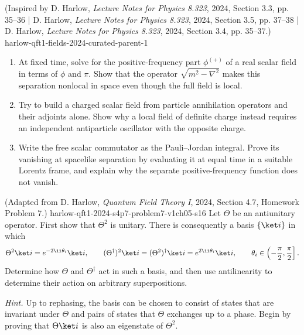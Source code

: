 \begin{enumerate}
  {(Inspired by D. Harlow, \emph{Lecture Notes for Physics 8.323}, 2024, Section 3.3, pp. 35--36 | D. Harlow, \emph{Lecture Notes for Physics 8.323}, 2024, Section 3.5, pp. 37--38 | D. Harlow, \emph{Lecture Notes for Physics 8.323}, 2024, Section 3.4, pp. 35--37.)}
  {harlow-qft1-fields-2024-curated-parent-1}
\begin{enumerate}
\item
At fixed time, solve for the positive-frequency part \(\phi^{(+)}\) of a
real scalar field in terms of \(\phi\) and \(\pi\).  Show that the operator
\(\sqrt{m^2-\nabla^2}\) makes this separation nonlocal in space even though
the full field is local.
\item
Try to build a charged scalar field from particle annihilation operators and
their adjoints alone.  Show why a local field of definite charge instead
requires an independent antiparticle oscillator with the opposite charge.
\item
Write the free scalar commutator as the Pauli--Jordan integral.  Prove its
vanishing at spacelike separation by evaluating it at equal time in a
suitable Lorentz frame, and explain why the separate positive-frequency
function does not vanish.
\end{enumerate}

  {(Adapted from D. Harlow, \emph{Quantum Field Theory I}, 2024, Section 4.7, Homework Problem 7.)}
  {harlow-qft1-2024-s4p7-problem7-v1ch05-s16}
Let \(\Theta\) be an antiunitary operator.  First show that \(\Theta^2\)
is unitary.  There is consequently a basis \(\{\ket i\}\) in which
\[
 \Theta^2\ket i=e^{-2\ii\theta_i}\ket i,
 \qquad
 (\Theta^\dagger)^2\ket i=(\Theta^2)^\dagger\ket i
 =e^{2\ii\theta_i}\ket i,
 \qquad
 \theta_i\in\left(-\frac\pi2,\frac\pi2\right].
\]
Determine how \(\Theta\) and \(\Theta^\dagger\) act in such a basis, and
then use antilinearity to determine their action on arbitrary
superpositions.

\emph{Hint.}  Up to rephasing, the basis can be chosen to consist of states
that are invariant under \(\Theta\) and pairs of states that \(\Theta\)
exchanges up to a phase.  Begin by proving that \(\Theta\ket i\) is also an
eigenstate of \(\Theta^2\).
\end{enumerate}
